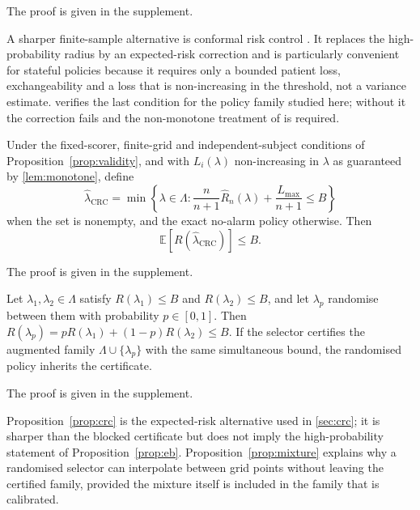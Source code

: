 The proof is given in the supplement.

A sharper finite-sample alternative is conformal risk control \citep{angelopoulos2022conformal}. It replaces the high-probability radius by an expected-risk correction and is particularly convenient for stateful policies because it requires only a bounded patient loss, exchangeability and a loss that is non-increasing in the threshold, not a variance estimate.  verifies the last condition for the policy family studied here; without it the correction fails and the non-monotone treatment of \cite{angelopoulos2026conformal} is required.

\begin{proposition}
\label{prop:crc}
Under the fixed-scorer, finite-grid and independent-subject conditions of Proposition~\ref{prop:validity}, and with $L_i(\lambda)$ non-increasing in $\lambda$ as guaranteed by \cref{lem:monotone}, define
\begin{equation}
\label{eq:crc-threshold}
\widehat\lambda_{\mathrm{CRC}}=\min\left\{\lambda\in\Lambda:
\frac{n}{n+1}\widehat R_n(\lambda)+\frac{L_{\max}}{n+1}\le B\right\}
\end{equation}
when the set is nonempty, and the exact no-alarm policy otherwise. Then
\begin{equation}
\label{eq:crc-bound}
\mathbb{E}\left[R(\widehat\lambda_{\mathrm{CRC}})\right]\le B .
\end{equation}
\end{proposition}

The proof is given in the supplement.

\begin{proposition}
\label{prop:mixture}
Let $\lambda_1,\lambda_2\in\Lambda$ satisfy $R(\lambda_1)\le B$ and $R(\lambda_2)\le B$, and let $\lambda_p$ randomise between them with probability $p\in[0,1]$. Then $R(\lambda_p)=pR(\lambda_1)+(1-p)R(\lambda_2)\le B$. If the selector certifies the augmented family $\Lambda\cup\{\lambda_p\}$ with the same simultaneous bound, the randomised policy inherits the certificate.
\end{proposition}

The proof is given in the supplement.

Proposition~\ref{prop:crc} is the expected-risk alternative used in \cref{sec:crc}; it is sharper than the blocked certificate but does not imply the high-probability statement of Proposition~\ref{prop:eb}. Proposition~\ref{prop:mixture} explains why a randomised selector can interpolate between grid points without leaving the certified family, provided the mixture itself is included in the family that is calibrated.

